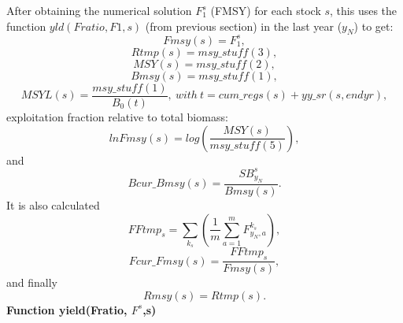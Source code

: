 \documentclass{article}
\begin{document}
After obtaining the numerical solution $F_1^s$ (FMSY) for each stock $s$, this uses the function $yld(Fratio, F1,s)$ (from previous section) in the last year ($y_N$) to get:
\begin{equation}
    Fmsy(s)=F_1^s,
\end{equation}
\begin{equation}
    Rtmp(s)=msy\_stuff(3),
\end{equation}
\begin{equation}
    MSY(s)=msy\_stuff(2),
\end{equation}
\begin{equation}
    Bmsy(s)=msy\_stuff(1),
\end{equation}
\begin{equation}
    MSYL(s)=\dfrac{msy\_stuff(1)}{B_0(t)},\ with \ t=cum\_regs(s)+yy\_sr(s,endyr),
\end{equation}
exploitation fraction relative to total biomass:
\begin{equation}
    lnFmsy(s)   = log\left(\dfrac{MSY(s)}{msy\_stuff(5)}\right),
\end{equation}
and
\begin{equation}
    Bcur\_Bmsy(s)= \dfrac{SB^s_{y_N}}{Bmsy(s)}.
\end{equation}
It is also calculated
\begin{equation}
    FFtmp_s=\sum_{k_s}\left(\dfrac{1}{m}\sum_{a=1}^mF^{k_s}_{y_N,a}\right),
\end{equation}
\begin{equation}
    Fcur\_Fmsy(s)= \dfrac{FFtmp_s}{Fmsy(s)},
\end{equation}
and finally
\begin{equation}
    Rmsy(s)     = Rtmp(s).
\end{equation}
\textbf{Function yield(Fratio, $F^s$,s)} \\
\end{document}

